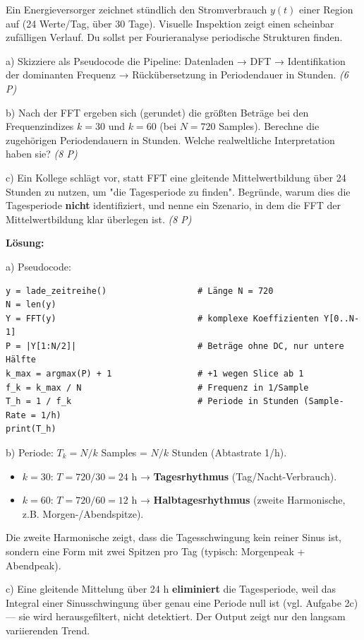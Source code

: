 \documentclass[11pt, a4paper]{article}
\begin{document}
Ein Energieversorger zeichnet stündlich den Stromverbrauch $y(t)$ einer Region auf (24 Werte/Tag, über 30 Tage). Visuelle Inspektion zeigt einen scheinbar zufälligen Verlauf. Du sollst per Fourieranalyse periodische Strukturen finden.


a) Skizziere als Pseudocode die Pipeline: Datenladen → DFT → Identifikation der dominanten Frequenz → Rückübersetzung in Periodendauer in Stunden. \textit{(6 P)}


b) Nach der FFT ergeben sich (gerundet) die größten Beträge bei den Frequenzindizes $k = 30$ und $k = 60$ (bei $N = 720$ Samples). Berechne die zugehörigen Periodendauern in Stunden. Welche realweltliche Interpretation haben sie? \textit{(8 P)}


c) Ein Kollege schlägt vor, statt FFT eine gleitende Mittelwertbildung über 24 Stunden zu nutzen, um "die Tagesperiode zu finden". Begründe, warum dies die Tagesperiode \textbf{nicht} identifiziert, und nenne ein Szenario, in dem die FFT der Mittelwertbildung klar überlegen ist. \textit{(8 P)}


\textbf{Lösung:}


a) Pseudocode:

\begin{lstlisting}
y = lade_zeitreihe()                  # Länge N = 720
N = len(y)
Y = FFT(y)                            # komplexe Koeffizienten Y[0..N-1]
P = |Y[1:N/2]|                        # Beträge ohne DC, nur untere Hälfte
k_max = argmax(P) + 1                 # +1 wegen Slice ab 1
f_k = k_max / N                       # Frequenz in 1/Sample
T_h = 1 / f_k                         # Periode in Stunden (Sample-Rate = 1/h)
print(T_h)
\end{lstlisting}


b) Periode: $T_k = N/k$ Samples = $N/k$ Stunden (Abtastrate 1/h).

\begin{itemize}
  \item $k = 30$: $T = 720/30 = 24$ h → \textbf{Tagesrhythmus} (Tag/Nacht-Verbrauch).
  \item $k = 60$: $T = 720/60 = 12$ h → \textbf{Halbtagesrhythmus} (zweite Harmonische, z.B. Morgen-/Abendspitze).
\end{itemize}

Die zweite Harmonische zeigt, dass die Tagesschwingung kein reiner Sinus ist, sondern eine Form mit zwei Spitzen pro Tag (typisch: Morgenpeak + Abendpeak).


c) Eine gleitende Mittelung über 24 h \textbf{eliminiert} die Tagesperiode, weil das Integral einer Sinusschwingung über genau eine Periode null ist (vgl. Aufgabe 2c) — sie wird herausgefiltert, nicht detektiert. Der Output zeigt nur den langsam variierenden Trend.
\end{document}
